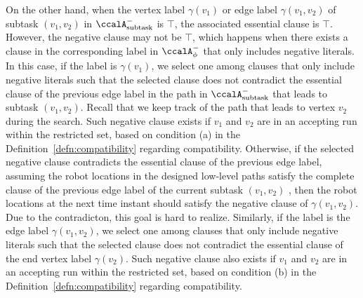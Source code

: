 \documentclass[Afour,sageh,times]{sagej}
\newcommand{\auto}[1]{\ccalA_{\textup{#1}}}
\newcommand{\autop}{\ccalA_{\phi}}
\begin{document}
{{   On the other hand, when the vertex label $\gamma(v_1)$ or edge label $\gamma(v_1, v_2)$ of subtask $(v_1, v_2)$ in $\auto{subtask}^-$ is $\top$, the associated essential clause is $\top$. However, the negative clause may not be $\top$, which happens when there exists a  clause in the corresponding label in $\autop^-$ that only includes negative literals. In this case, if the label is $\gamma(v_1)$, we select one  among clauses that only include negative literals such that the selected clause does not contradict the essential clause of the previous edge label in the path in $\auto{subtask}^-$ that leads to subtask $(v_1, v_2)$. Recall that we keep track of the path that leads to vertex $v_2$ during the search.   Such negative clause exists if $v_1$ and $v_2$ are in an accepting run within the restricted set,  based on condition (a)  in the Definition~\ref{defn:compatibility} regarding compatibility.
   Otherwise, if the selected negative clause contradicts the essential clause of the previous edge label, assuming the robot locations in the designed low-level paths  satisfy the complete clause of the previous edge label of the current subtask $(v_1, v_2)$ , then the robot locations at the next time instant  should satisfy the negative clause of $\gamma(v_1, v_2)$. Due to the contradicton, this goal is hard to realize.  Similarly, if the label is the edge label $\gamma(v_1, v_2)$, we select one among clauses that only include negative literals such that the selected clause does not contradict the essential clause of the end vertex label $\gamma(v_2)$. Such negative clause also exists  if $v_1$ and $v_2$ are in an accepting run within the restricted set,  based on condition (b)  in the Definition~\ref{defn:compatibility} regarding compatibility.}



}
\end{document}
